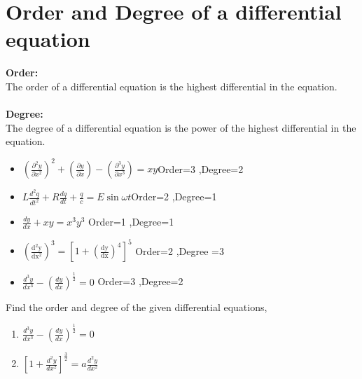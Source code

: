 \section{Order and Degree of a differential equation}
\textbf{Order:}\\The order of a differential equation is the highest differential in the equation.\\\\
\textbf{Degree:}\\The degree of a differential equation is the power of the highest differential in the equation.
\begin{example}
	\hspace{0.5cm}
	\begin{itemize}
		\item $\left(\frac{\partial^{2} y}{\partial x^{2}}\right)^{2}+\left(\frac{\partial y}{\partial x}\right)-\left(\frac{\partial^{3} y}{\partial x^{3}}\right)=x y$\hspace{0.5cm}Order=3 ,Degree=2
		\item   $ L \frac{d^{2} q}{d t^{2}}+R \frac{d q}{d t}+\frac{q}{c}=E \sin \omega t$\hspace{1cm}Order=2 ,Degree=1
		\item $\frac{dy}{dx}+xy=x^{3}y^{3}$ \hspace{2.7cm}Order=1 ,Degree=1
		\item $\left(\frac{\mathrm{d}^{2} \mathrm{y}}{\mathrm{d} \mathrm{x}^{2}}\right)^{3}=\left[1+\left(\frac{\mathrm{dy}}{\mathrm{dx}}\right)^{4}\right]^{5}$
	 \hspace{1.1cm} Order=2 ,Degree =3
	 \item $\frac{d^{3} y}{d x^{3}}-\left(\frac{d y}{d x}\right)^{\frac{1}{2}}=0$ \hspace{2.3cm} Order=3 ,Degree=2
	\end{itemize}
\end{example}
\begin{exercise}
Find the order and degree of the given differential equations, 

\begin{enumerate}
	\item $\frac{d^{3} y}{d x^{3}}-\left(\frac{d y}{d x}\right)^{\frac{1}{2}}=0$
	\item $\left[1+\frac{d^{2} y}{d x^{2}}\right]^{\frac{3}{2}}=a \frac{d^{2} y}{d x^{2}}$
\end{enumerate}
\end{exercise}
